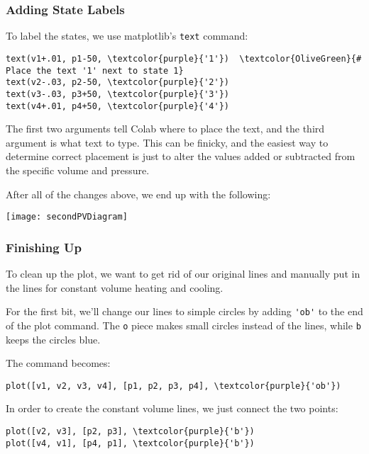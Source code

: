 \subsubsection{Adding State Labels}

To label the states, we use matplotlib's \verb~text~ command:

\begin{Verbatim}[commandchars=\\\{\}]
text(v1+.01, p1-50, \textcolor{purple}{'1'})  \textcolor{OliveGreen}{# Place the text '1' next to state 1}
text(v2-.03, p2-50, \textcolor{purple}{'2'})
text(v3-.03, p3+50, \textcolor{purple}{'3'})
text(v4+.01, p4+50, \textcolor{purple}{'4'})
\end{Verbatim}

The first two arguments tell Colab where to place the text, and the third argument is what text to type.  This can be finicky, and the easiest way to determine correct placement is just to alter the values added or subtracted from the specific volume and pressure.

After all of the changes above, we end up with the following:
\begin{center}
\texttt{[image: secondPVDiagram]}
\end{center}

\subsubsection{Finishing Up}
To clean up the plot, we want to get rid of our original lines and manually put in the lines for constant volume heating and cooling.

For the first bit, we'll change our lines to simple circles by adding \verb~'ob'~ to the end of the plot command.  The \verb~o~ piece makes small circles instead of the lines, while \verb~b~ keeps the circles blue.

The command becomes:
\begin{Verbatim}[commandchars=\\\{\}]
plot([v1, v2, v3, v4], [p1, p2, p3, p4], \textcolor{purple}{'ob'})
\end{Verbatim}

In order to create the constant volume lines, we just connect the two points:
\begin{Verbatim}[commandchars=\\\{\}]
plot([v2, v3], [p2, p3], \textcolor{purple}{'b'})
plot([v4, v1], [p4, p1], \textcolor{purple}{'b'})
\end{Verbatim}

